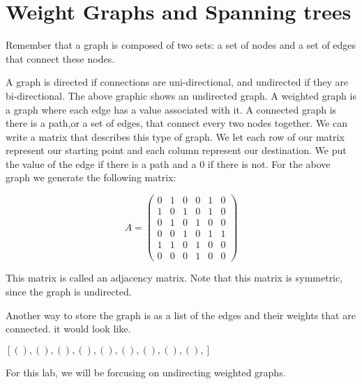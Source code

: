 \label{Ch:Kruskal}


\section*{Weight Graphs and Spanning trees}


Remember that a graph is composed of two sets: a set of nodes and a set of edges that connect these nodes. 

A graph is directed if connections are uni-directional, and undirected if they are bi-directional. The above graphic shows an undirected graph. A weighted graph is a graph where each edge has a value associated with it. A connected graph is there is a path,or a set of edges, that connect every two nodes together. We can write a matrix that describes this type of graph. We let each row of our matrix represent our starting point and each column represent our destination. We put the value of the edge if there is a path and a 0 if there is not. For the above graph we generate the following matrix:

\[
A = \begin{pmatrix}
0 & 1 & 0 & 0 & 1 & 0\\
1 & 0 & 1 & 0 & 1 & 0\\
0 & 1 & 0 & 1 & 0 & 0\\
0 & 0 & 1 & 0 & 1 & 1\\
1 & 1 & 0 & 1 & 0 & 0\\
0 & 0 & 0 & 1 & 0 & 0
\end{pmatrix}
\]

This matrix is called an adjacency matrix. Note that this matrix is symmetric, since the graph is undirected. 

Another way to store the graph is as a list of the edges and their weights that are connected. it would look like.

$[(   ),
 (   ),
 (   ),
 (   ),
 (   ),
 (   ),
 (   ),
 (   ),
 (   ),]$

For this lab, we will be forcusing on undirecting weighted graphs. 

